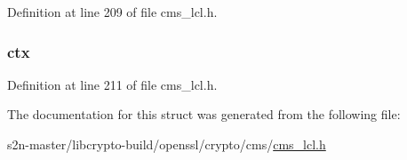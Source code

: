 Definition at line 209 of file cms\+\_\+lcl.\+h.

\subsubsection[{\texorpdfstring{ctx}{ctx}}]{ ctx}\hypertarget{struct_c_m_s___key_agree_recipient_info__st_a2495707d38554dedf142a99b04a278f8}{}\label{struct_c_m_s___key_agree_recipient_info__st_a2495707d38554dedf142a99b04a278f8}


Definition at line 211 of file cms\+\_\+lcl.\+h.



The documentation for this struct was generated from the following file\+:\begin{DoxyCompactItemize}
\item 
s2n-\/master/libcrypto-\/build/openssl/crypto/cms/\hyperlink{cms__lcl_8h}{cms\+\_\+lcl.\+h}\end{DoxyCompactItemize}
